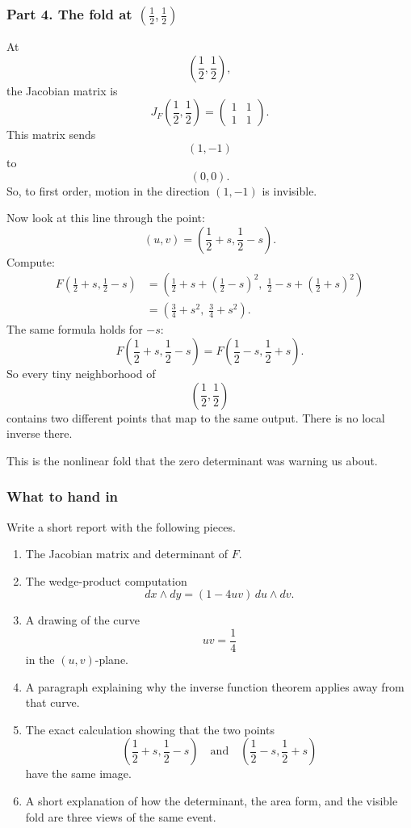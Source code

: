 \subsubsection*{Part 4. The fold at \texorpdfstring{\(\left(\frac12,\frac12\right)\)}{(1/2,1/2)}}

At
\[
    \left(\frac12,\frac12\right),
\]
the Jacobian matrix is
\[
    J_F\left(\frac12,\frac12\right)
    =
    \begin{pmatrix}
        1 & 1\\
        1 & 1
    \end{pmatrix}.
\]
This matrix sends
\[
    (1,-1)
\]
to
\[
    (0,0).
\]
So, to first order, motion in the direction \((1,-1)\) is invisible.

Now look at this line through the point:
\[
    (u,v)=\left(\frac12+s,\frac12-s\right).
\]
Compute:
\[
\begin{aligned}
F\left(\frac12+s,\frac12-s\right)
&=
\left(
\frac12+s+\left(\frac12-s\right)^2,\;
\frac12-s+\left(\frac12+s\right)^2
\right)\\
&=
\left(
\frac34+s^2,\;
\frac34+s^2
\right).
\end{aligned}
\]
The same formula holds for \(-s\):
\[
F\left(\frac12+s,\frac12-s\right)
=
F\left(\frac12-s,\frac12+s\right).
\]
So every tiny neighborhood of
\[
    \left(\frac12,\frac12\right)
\]
contains two different points that map to the same output.  There is no local inverse
there.

This is the nonlinear fold that the zero determinant was warning us about.

\subsubsection*{What to hand in}

Write a short report with the following pieces.

\begin{enumerate}
\item The Jacobian matrix and determinant of \(F\).

\item The wedge-product computation
\[
    dx\wedge dy=(1-4uv)\,du\wedge dv.
\]

\item A drawing of the curve
\[
    uv=\frac14
\]
in the \((u,v)\)-plane.

\item A paragraph explaining why the inverse function theorem applies away from that
curve.

\item The exact calculation showing that the two points
\[
    \left(\frac12+s,\frac12-s\right)
    \quad\text{and}\quad
    \left(\frac12-s,\frac12+s\right)
\]
have the same image.

\item A short explanation of how the determinant, the area form, and the visible fold are
three views of the same event.
\end{enumerate}

